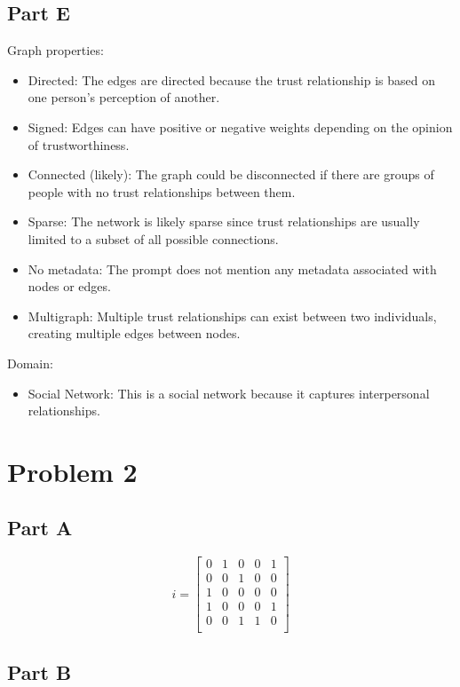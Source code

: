 \documentclass[12pt]{article}
\begin{document}
\subsection*{Part E}
Graph properties:
\begin{itemize}
    \item Directed: The edges are directed because the trust relationship is based on one person's perception of another.
    \item Signed: Edges can have positive or negative weights depending on the opinion of trustworthiness.
    \item Connected (likely): The graph could be disconnected if there are groups of people with no trust relationships between them.
    \item Sparse: The network is likely sparse since trust relationships are usually limited to a subset of all possible connections.
    \item No metadata: The prompt does not mention any metadata associated with nodes or edges.
    \item Multigraph: Multiple trust relationships can exist between two individuals, creating multiple edges between nodes.
\end{itemize}

\noindent Domain:
\begin{itemize}
    \item Social Network: This is a social network because it captures interpersonal relationships.
\end{itemize}

\section*{Problem 2}

\subsection*{Part A}

\[
i = \begin{bmatrix}
0 & 1 & 0 & 0 & 1 \\ 
0 & 0 & 1 & 0 & 0 \\ 
1 & 0 & 0 & 0 & 0 \\ 
1 & 0 & 0 & 0 & 1 \\ 
0 & 0 & 1 & 1 & 0 \\
\end{bmatrix}
\]


\subsection*{Part B}
\end{document}

